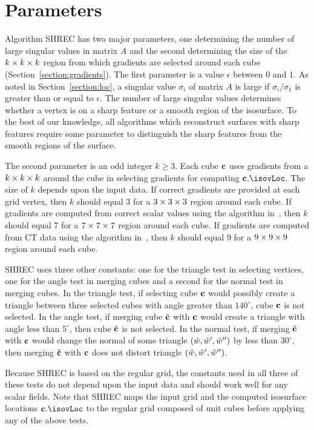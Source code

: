 \section{Parameters}
\label{section:parameters}

Algorithm SHREC has two major parameters,
one determining the number of large singular values in matrix $A$
and the second determining the size of the $k \times k \times k$ region 
from which gradients are selected around each cube
(Section~\ref{section:gradients}).
The first parameter is a value $\epsilon$ between 0 and 1.
As noted in Section~\ref{section:loc},
a singular value $\sigma_i$ of matrix $A$ 
is large if $\sigma_i/\sigma_1$ is greater than or equal to $\epsilon$.
The number of large singular values determines whether a vertex
is on a sharp feature or a smooth region of the isosurface.
To the best of our knowledge, all algorithms which reconstruct surfaces 
with sharp features require some parameter
to distinguish the sharp features from the smooth regions of the surface.

The second parameter is an odd integer $k \ge 3$.
Each cube $\mathbf{c}$ uses gradients from a $k \times k \times k$ around the cube
in selecting gradients for computing $\cb.\isovLoc$.
The size of $k$ depends upon the input data.
If correct gradients are provided at each grid vertex,
then $k$ should equal 3 for a $3 \times 3 \times 3$ region around each cube.
If gradients are computed from correct scalar values 
using the algorithm in~\cite{bw-crgsd-15},
then $k$ should equal 7 for a $7 \times 7 \times 7$ region around each cube.
If gradients are computed from CT data 
using the algorithm in~\cite{bw-crgsd-15},
then $k$ should equal 9 for a $9 \times 9 \times 9$ region around each cube.

SHREC uses three other constants:
one for the triangle test in selecting vertices,
one for the angle test in merging cubes
and a second for the normal test in merging cubes.
In the triangle test,
if selecting cube $\mathbf{c}$ would possibly create a triangle between three
selected cubes with angle greater than $140^\circ$, 
cube $\mathbf{c}$ is not selected.
In the angle test,
if merging cube ${\tilde{\mathbf{c}}}$ with $\mathbf{c}$ would create a triangle with angle
less than $5^\circ$, then cube ${\tilde{\mathbf{c}}}$ is not selected.
In the normal test,
if merging ${\tilde{\mathbf{c}}}$ with $\mathbf{c}$ would change the normal 
of some triangle $(\tilde{w},\tilde{w}',\tilde{w}'')$ by less than $30^\circ$,
then merging ${\tilde{\mathbf{c}}}$ with $\mathbf{c}$ does not distort triangle $(\tilde{w},\tilde{w}',\tilde{w}'')$.

Because SHREC is based on the regular grid,
the constants used in all three of these tests do not depend 
upon the input data and should work well for any scalar fields.
Note that SHREC maps the input grid 
and the computed isosurface locations $\cb.\isovLoc$
to the regular grid composed of unit cubes
before applying any of the above tests.
